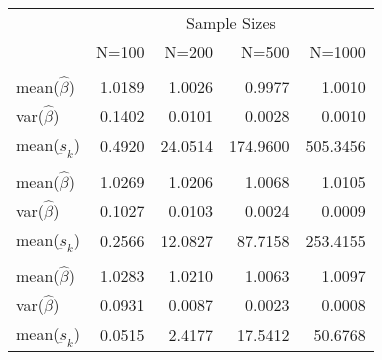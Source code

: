 
\begin{tabular}{lrrrr}
\toprule
\multicolumn{1}{c}{ } & \multicolumn{4}{c}{Sample Sizes} \\
\cmidrule(l{3pt}r{3pt}){2-5}
  & N=100 & N=200 & N=500 & N=1000\\
\midrule
\addlinespace[0.3em]
\multicolumn{5}{l}{\textbf{$ \rho = 0 $  }}\\
\hspace{1em}mean($\hat{\beta}$) & 1.0189 & 1.0026 & 0.9977 & 1.0010\\
\hspace{1em}var($\hat{\beta}$) & 0.1402 & 0.0101 & 0.0028 & 0.0010\\
\hspace{1em}mean($\underbar{s}_k$) & 0.4920 & 24.0514 & 174.9600 & 505.3456\\
\addlinespace[0.3em]
\multicolumn{5}{l}{\textbf{$ \rho = 0.5 $}}\\
\hspace{1em}mean($\hat{\beta}$) & 1.0269 & 1.0206 & 1.0068 & 1.0105\\
\hspace{1em}var($\hat{\beta}$) & 0.1027 & 0.0103 & 0.0024 & 0.0009\\
\hspace{1em}mean($\underbar{s}_k$) & 0.2566 & 12.0827 & 87.7158 & 253.4155\\
\addlinespace[0.3em]
\multicolumn{5}{l}{\textbf{$ \rho = 0.9 $}}\\
\hspace{1em}mean($\hat{\beta}$) & 1.0283 & 1.0210 & 1.0063 & 1.0097\\
\hspace{1em}var($\hat{\beta}$) & 0.0931 & 0.0087 & 0.0023 & 0.0008\\
\hspace{1em}mean($\underbar{s}_k$) & 0.0515 & 2.4177 & 17.5412 & 50.6768\\
\bottomrule
\end{tabular}
